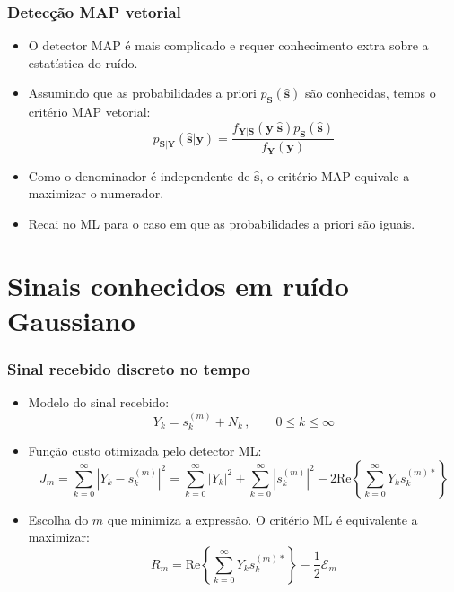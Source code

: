 \begin{frame}
	\frametitle{Detecção MAP vetorial}

	\begin{itemize}
	    \item O detector MAP é mais complicado e requer conhecimento extra sobre a estatística do ruído.
	    \item Assumindo que as probabilidades a priori $p_{\mathbf{S}}(\hat{\mathbf{s}})$ são conhecidas, temos o critério MAP vetorial:
	    \begin{equation*}
		p_{\mathbf{S}|\mathbf{Y}}(\hat{\mathbf{s}}|\mathbf{y}) = \frac{f_{\mathbf{Y}|\mathbf{S}}(\mathbf{y}|\hat{\mathbf{s}}) p_{\mathbf{S}}(\hat{\mathbf{s}})}{f_{\mathbf{Y}}(\mathbf{y})}
	    \end{equation*}
	    \item Como o denominador é independente de $\hat{\mathbf{s}}$, o critério MAP equivale a maximizar o numerador.
	    \item Recai no ML para o caso em que as probabilidades a priori são iguais.
	\end{itemize}			
\end{frame}

\section{Sinais conhecidos em ruído Gaussiano}

\begin{frame}
	\frametitle{Sinal recebido discreto no tempo}

	\begin{itemize}
	    \item Modelo do sinal recebido:
	    \begin{equation*}
		Y_k = s_k^{(m)} + N_k \, , \qquad 0 \leq k \leq \infty
	    \end{equation*}
	    \item Função custo otimizada pelo detector ML:
	    \begin{equation*}
		J_m = \sum_{k=0}^{\infty} \left|Y_k - s_k^{(m)} \right|^2 = \sum_{k=0}^{\infty} \left|Y_k \right|^2 + \sum_{k=0}^{\infty} \left| s_k^{(m)} \right|^2 - 2 \mathrm{Re} \left\{\sum_{k=0}^{\infty} Y_k s_k^{(m)*} \right\}
	    \end{equation*}
	    \item Escolha do $m$ que minimiza a expressão. O critério ML é equivalente a maximizar:
	    \begin{equation*}
		R_m = \mathrm{Re}\left\{\sum_{k=0}^{\infty} Y_k s_k^{(m)*} \right\} - \frac{1}{2}\mathcal{E}_m
	    \end{equation*}

	\end{itemize}			
\end{frame}


